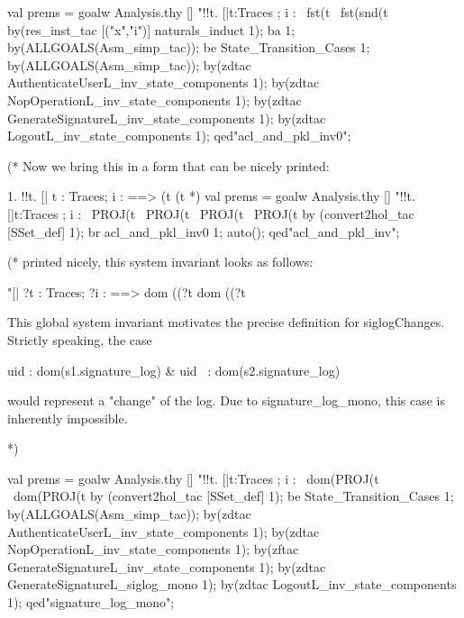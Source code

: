\documentclass[a4paper,pdftex]{article}
\newenvironment{holz-ml}{\comment}{\endcomment}
\begin{document}
\begin{holz-ml}
val prems = goalw Analysis.thy [] 
"!!t. [|t:Traces ; i : %
\ fst(t %
\ fst(snd(t %
by(res_inst_tac [("x","i")] naturals_induct 1);
ba 1;
by(ALLGOALS(Asm_simp_tac));
be State_Transition_Cases 1;
by(ALLGOALS(Asm_simp_tac));
by(zdtac AuthenticateUserL_inv_state_components 1);
by(zdtac NopOperationL_inv_state_components 1);
by(zdtac GenerateSignatureL_inv_state_components 1);
by(zdtac LogoutL_inv_state_components 1);
qed"acl_and_pkl_inv0";


(* Now we bring this in a form that can be nicely
   printed: 

 1. !!t. [| t : Traces; i : %
         ==> (t %
             (t %
 *)
val prems = goalw Analysis.thy [] 
"!!t. [|t:Traces ; i : %
\  PROJ(t %
\  PROJ(t %
\  PROJ(t %
\  PROJ(t %
by (convert2hol_tac [SSet_def] 1); 
br  acl_and_pkl_inv0 1;
auto();
qed"acl_and_pkl_inv";



(* printed nicely, this system invariant looks as follows:

    "[| ?t : Traces; ?i : %
    ==> dom ((?t %
        dom ((?t %

    This global system invariant motivates the precise definition for 
    siglogChanges. Strictly speaking, the case 

       uid : dom(s1.signature_log) & uid ~: dom(s2.signature_log)

    would represent a "change" of the log. Due to signature_log_mono, 
    this case is inherently impossible.

 *)

val prems = goalw Analysis.thy [] 
"!!t. [|t:Traces ; i : %
\  dom(PROJ(t %
\  dom(PROJ(t %
by (convert2hol_tac [SSet_def] 1); 
be State_Transition_Cases 1;
by(ALLGOALS(Asm_simp_tac));
by(zdtac AuthenticateUserL_inv_state_components 1);
by(zdtac NopOperationL_inv_state_components 1);
by(zftac GenerateSignatureL_inv_state_components 1);
by(zdtac GenerateSignatureL_siglog_mono 1);
by(zdtac LogoutL_inv_state_components 1);
qed"signature_log_mono";



\end{holz-ml}
\end{document}
